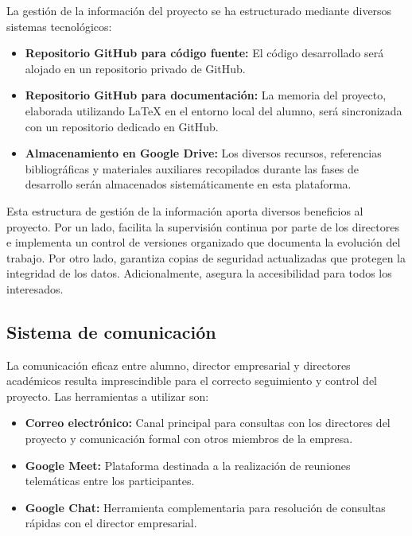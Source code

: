 La gestión de la información del proyecto se ha estructurado mediante diversos sistemas tecnológicos:
\begin{itemize}
\item \textbf{Repositorio GitHub para código fuente:} El código desarrollado será alojado en un repositorio privado de GitHub.
\item \textbf{Repositorio GitHub para documentación:} La memoria del proyecto, elaborada utilizando LaTeX en el entorno local del alumno, será sincronizada con un repositorio dedicado en GitHub.
\item \textbf{Almacenamiento en Google Drive:} Los diversos recursos, referencias bibliográficas y materiales auxiliares recopilados durante las fases de desarrollo serán almacenados sistemáticamente en esta plataforma.
\end{itemize}
Esta estructura de gestión de la información aporta diversos beneficios al proyecto. Por un lado, facilita la supervisión continua por parte de los directores e implementa un control de versiones organizado que documenta la evolución del trabajo. Por otro lado, garantiza copias de seguridad actualizadas que protegen la integridad de los datos. Adicionalmente, asegura la accesibilidad para todos los interesados.


\subsection{Sistema de comunicación}
La comunicación eficaz entre alumno, director empresarial y directores académicos resulta imprescindible para el correcto seguimiento y control del proyecto. Las herramientas a utilizar son:
\begin{itemize}
\item\textbf{Correo electrónico: }Canal principal para consultas con los directores del proyecto y comunicación formal con otros miembros de la empresa.
\item\textbf{Google Meet: }Plataforma destinada a la realización de reuniones telemáticas entre los participantes.
\item\textbf{Google Chat: }Herramienta complementaria para resolución de consultas rápidas con el director empresarial.
\end{itemize}

